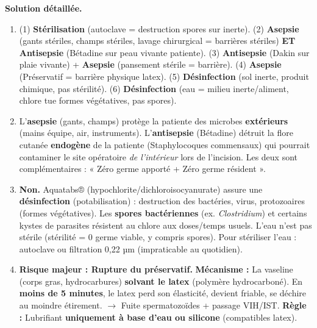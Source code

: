 \documentclass[11pt]{article}
\begin{document}
\begin{exoresolu}
\textbf{Solution détaillée.}
\begin{enumerate}
    \item (1) \textbf{Stérilisation} (autoclave = destruction spores sur inerte). (2) \textbf{Asepsie} (gants stériles, champs stériles, lavage chirurgical = barrières stériles) \textbf{ET} \textbf{Antisepsie} (Bétadine sur peau vivante patiente). (3) \textbf{Antisepsie} (Dakin sur plaie vivante) + \textbf{Asepsie} (pansement stérile = barrière). (4) \textbf{Asepsie} (Préservatif = barrière physique latex). (5) \textbf{Désinfection} (sol inerte, produit chimique, pas stérilité). (6) \textbf{Désinfection} (eau = milieu inerte/aliment, chlore tue formes végétatives, pas spores).
    \item L'\textbf{asepsie} (gants, champs) protège la patiente des microbes \textbf{extérieurs} (mains équipe, air, instruments). L'\textbf{antisepsie} (Bétadine) détruit la flore cutanée \textbf{endogène} de la patiente (Staphylocoques commensaux) qui pourrait contaminer le site opératoire \emph{de l'intérieur} lors de l'incision. Les deux sont complémentaires : « Zéro germe apporté + Zéro germe résident ».
    \item \textbf{Non.} Aquatabs® (hypochlorite/dichloroisocyanurate) assure une \textbf{désinfection} (potabilisation) : destruction des bactéries, virus, protozoaires (formes végétatives). Les \textbf{spores bactériennes} (ex. \textit{Clostridium}) et certains kystes de parasites résistent au chlore aux doses/temps usuels. L'eau n'est pas stérile (stérilité = 0 germe viable, y compris spores). Pour stériliser l'eau : autoclave ou filtration 0,22 µm (impraticable au quotidien).
    \item \textbf{Risque majeur : Rupture du préservatif.} \textbf{Mécanisme :} La vaseline (corps gras, hydrocarbures) \textbf{solvant le latex} (polymère hydrocarboné). En \textbf{moins de 5 minutes}, le latex perd son élasticité, devient friable, se déchire au moindre étirement. $\rightarrow$ Fuite spermatozoïdes + passage VIH/IST. \textbf{Règle :} Lubrifiant \textbf{uniquement à base d'eau ou silicone} (compatibles latex).
\end{enumerate}
\end{exoresolu}
\end{document}
